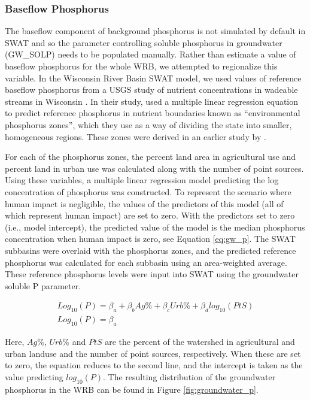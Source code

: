 \subsubsection{Baseflow Phosphorus} \label{sec:gwp}
	The baseflow component of background phosphorus is not simulated by default in SWAT and so the parameter controlling soluble phosphorus in groundwater (GW\_SOLP) needs to be populated manually. Rather than estimate a value of baseflow phosphorus for the whole WRB, we attempted to regionalize this variable. In the Wisconsin River Basin SWAT model, we used values of reference baseflow phosphorus from a USGS study of nutrient concentrations in wadeable streams in Wisconsin \citep{robertson_wadeable_2006}. In their study, \citet{robertson_wadeable_2006} used a multiple linear regression equation to predict reference phosphorus in nutrient boundaries known as ``environmental phosphorus zones'', which they use as a way of dividing the state into smaller, homogeneous regions. These zones were derived in an earlier study by \citet{robertson_phosphoruszones_2006}.

	
	For each of the phosphorus zones, the percent land area in agricultural use and percent land in urban use was calculated along with the number of point sources. Using these variables, a multiple linear regression model predicting the log concentration of phosphorus was constructed. To represent the scenario where human impact is negligible, the values of the predictors of this model (all of which represent human impact) are set to zero. With the predictors set to zero (i.e., model intercept), the predicted value of the model is the median phosphorus concentration when human impact is zero, see Equation \ref{eq:gw_p}. The SWAT subbasins were overlaid with the phosphorus zones, and the predicted reference phosphorus was calculated for each subbasin using an area-weighted average. These reference phosphorus levels were input into SWAT using the groundwater soluble P parameter.
	
	
	\begin{eqnarray}
	Log_{10}(P) = \beta_a + \beta_bAg\% + \beta_cUrb\% + \beta_dlog_{10}(PtS)      \\
	
	Log_{10}(P) = \beta_a 
	\label{eq:gw_p}
	\end{eqnarray}
		
	Here, $Ag\%$, $Urb\%$ and $PtS$ are the percent of the watershed in agricultural and urban landuse and the number of point sources, respectively. When these are set to zero, the equation reduces to the second line, and the intercept is taken as the value predicting $log_{10}(P)$. The resulting distribution of the groundwater phosphorus in the WRB can be found in Figure \ref{fig:groundwater_p}.
	
